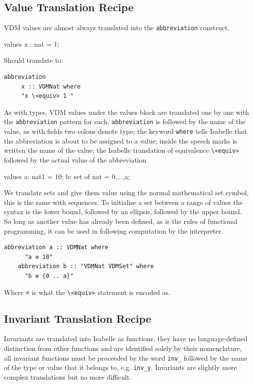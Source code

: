 	\subsection{Value Translation Recipe}
	VDM values are almost always translated into the \lstinline[language=Isabelle]{abbreviation} construct.
	\begin{vdmsl}
	values
	x : nat = 1;
	\end{vdmsl}
	Should translate to:
	\begin{lstlisting}[language=Isabelle]
	abbreviation
	 x :: VDMNat where 
	 "x \<equiv> 1 " 
	\end{lstlisting}
	As with types, VDM values under the values block are translated one by one with the \lstinline[language=Isabelle]{abbreviation} pattern for each. \lstinline[language=Isabelle]{abbreviation} is followed by the name of the value, as with fields two colons denote type; the keyword \lstinline[language=Isabelle]{where} tells Isabelle that the abbreviation is about to be assigned to a value; inside the speech marks is written the name of the value; the Isabelle translation of equivalence \lstinline[language=Isabelle]{\<equiv>} followed by the actual value of the abbreviation.
	\begin{vdmsl}
	values
		a: nat1 = 10;
		b: set of nat = {0,...,a};
	\end{vdmsl}
	We translate sets and give them value using the normal mathematical set symbol, this is the same with sequences. To initialise a set between a range of values the syntax is the lower bound, followed by an ellipsis, followed by the upper bound. So long as another value has already been defined, as is the rules of functional programming, it can be used in following computation by the interpreter.
	\begin{lstlisting}[language=Isabelle]
	abbreviation a :: VDMNat where 
	  "a ≡ 10"
	abbreviation b :: "VDMNat VDMSet" where 
	  "b ≡ {0 .. a}" 
	\end{lstlisting}
	Where ≡ is what the \lstinline[language=Isabelle]{\<equiv>} statement is encoded as.

	\subsection{Invariant Translation Recipe}
	Invariants are translated into Isabelle as functions, they have no language-defined distinction from other functions and are identified solely by their nomenclature, all invariant functions must be proceeded by the word \lstinline[language=Isabelle]{inv_} followed by the name of the type or value that it belongs to, e.g. \lstinline[language=Isabelle]{inv_y}. Invariants are slightly more complex translations but no more difficult.

